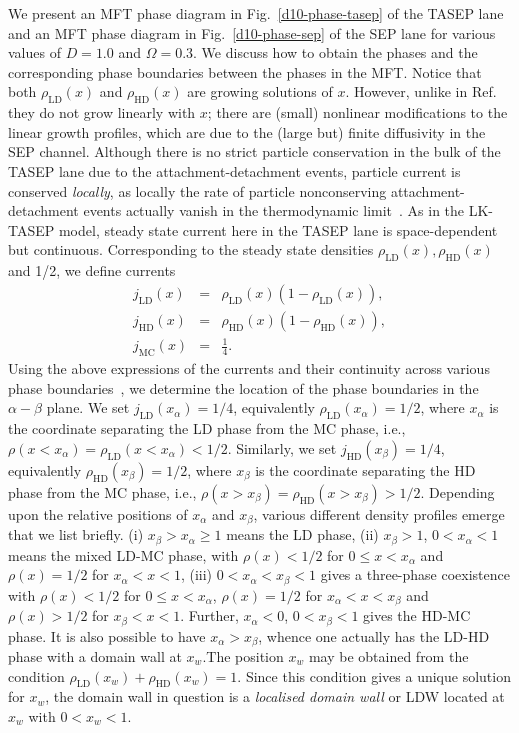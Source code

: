\documentclass[aps,pre,twocolumn,superscriptaddress,amsmath,amssymb,longbibliography,floatfix]{revtex4}
\begin{document}
{We present an MFT phase diagram in Fig.~\ref{d10-phase-tasep} of the TASEP lane and an MFT phase diagram in Fig.~\ref{d10-phase-sep} of the SEP lane for various values of $D=1.0$ and $\Omega=0.3$. We discuss how to obtain the phases and the corresponding phase boundaries between the phases in the MFT. Notice that both $\rho_\text{LD}(x)$ and $\rho_\text{HD}(x)$ are growing solutions of $x$. However, unlike in Ref.~\cite{frey-lktasep} they do not grow linearly with $x$; there are (small) nonlinear modifications to the linear growth profiles, which are due to the (large but) finite diffusivity in the SEP channel. Although there is no strict particle conservation in the bulk of the TASEP lane due to the attachment-detachment events, particle current is conserved {\em locally}, as locally the rate of particle nonconserving attachment-detachment events actually vanish in the thermodynamic limit~\cite{frey-lktasep}. As in the LK-TASEP model, steady state current here in the TASEP lane is space-dependent but continuous. Corresponding to the steady state densities $\rho_\text{LD}(x),\rho_\text{HD}(x)$ and 1/2, we define currents
\begin{eqnarray}
 j_\text{LD}(x)&=&\rho_\text{LD}(x) (1-\rho_\text{LD}(x)),\label{curr1}\\
 j_\text{HD}(x)&=&\rho_\text{HD}(x) (1-\rho_\text{HD}(x)),\label{curr2}\\
 j_\text{MC}(x)&=&\frac{1}{4} \label{curr3}.
\end{eqnarray}
Using the above expressions of the currents and their continuity across various phase boundaries~\cite{frey-lktasep}, we determine the location of the phase boundaries in the $\alpha-\beta$ plane. We set $j_\text{LD}(x_\alpha)=1/4$, equivalently $\rho_\text{LD}(x_\alpha)=1/2$, where $x_\alpha$ is the coordinate separating the LD phase from the MC phase, i.e., $\rho (x<x_\alpha)=\rho_\text{LD}(x<x_\alpha)<1/2$. Similarly, we set $j_\text{HD}(x_\beta)=1/4$, equivalently $\rho_\text{HD}(x_\beta)=1/2$, where $x_\beta$ is the coordinate separating the HD phase from the MC phase, i.e., $\rho (x>x_\beta)=\rho_\text{HD}(x>x_\beta)>1/2$. Depending upon the relative positions of $x_\alpha$ and $x_\beta$, various different density profiles emerge that we list briefly. (i) $x_\beta>x_\alpha\geq 1$ means the LD phase, (ii) $x_\beta>1$, $0<x_\alpha<1$ means the mixed LD-MC phase, with $\rho(x)<1/2$ for $0\leq x<x_\alpha$ and $\rho(x)=1/2$ for $x_\alpha<x<1$, (iii) $0<x_\alpha<x_\beta<1$ gives a three-phase coexistence with $\rho(x)<1/2$ for $0\leq x<x_\alpha$, $\rho(x)=1/2$ for $x_\alpha<x<x_\beta$ and $\rho(x)>1/2$ for $x_\beta<x<1$. Further, $x_\alpha<0$, $0<x_\beta<1$ gives the HD-MC phase. It is also possible to have $x_\alpha>x_\beta$, whence one actually has the LD-HD phase with a domain wall at $x_w$.The position $x_w$ may be obtained from the condition $\rho_\text{LD}(x_w)+\rho_\text{HD}(x_w)=1$. Since this condition gives a unique solution for $x_w$, the domain wall in question is a {\em localised domain wall} or LDW located at $x_w$ with $0<x_w<1$.





}
\end{document}
